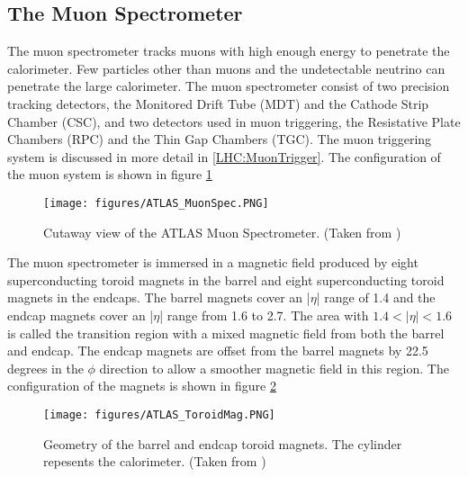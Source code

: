 \subsection{The Muon Spectrometer}
\label{LHC:MuonSpec}
\indent The muon spectrometer tracks muons with high enough energy to penetrate the calorimeter. Few particles other than muons and the undetectable neutrino can penetrate the large calorimeter. The muon spectrometer consist of two precision tracking detectors, the Monitored Drift Tube (MDT) and the Cathode Strip Chamber (CSC), and two detectors used in muon triggering, the Resistative Plate Chambers (RPC) and the Thin Gap Chambers (TGC). The muon triggering system is discussed in more detail in \ref{LHC:MuonTrigger}. The configuration of the muon system is shown in figure \ref{LHC:fig:ATLASMuonSpec} ~\\
\begin{figure}[h!]
\centering
\texttt{[image: figures/ATLAS\_MuonSpec.PNG]}
\caption{ Cutaway view of the ATLAS Muon Spectrometer. (Taken from \cite{biblio:JINST}) \label{LHC:fig:ATLASMuonSpec}}
\end{figure}

\indent The muon spectrometer is immersed in a magnetic field produced by eight superconducting toroid magnets in the barrel and eight superconducting toroid magnets in the endcaps. The barrel magnets cover an |$\eta$| range of 1.4 and the endcap magnets cover an |$\eta$| range from 1.6 to 2.7. The area with $1.4 < |\eta| < 1.6$ is called the transition region with a mixed magnetic field from both the barrel and endcap. The endcap magnets are offset from the barrel magnets by 22.5 degrees in the $\phi$ direction to allow a smoother magnetic field in this region. The configuration of the magnets is shown in figure \ref{LHC:fig:ATLASMag} ~\\
\begin{figure}[h!]
\centering
\texttt{[image: figures/ATLAS\_ToroidMag.PNG]}
\caption{ Geometry of the barrel and endcap toroid magnets. The cylinder repesents the calorimeter. (Taken from \cite{biblio:JINST}) \label{LHC:fig:ATLASMag}}
\end{figure}

